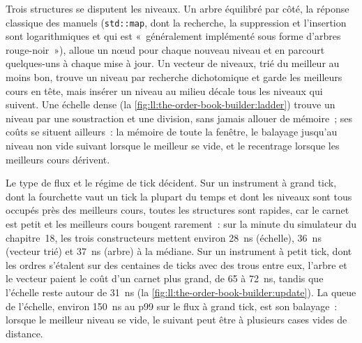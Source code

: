 Trois structures se disputent les niveaux. Un arbre équilibré par côté, la réponse classique des manuels (\texttt{std::map}, dont la recherche,
la suppression et l'insertion sont logarithmiques et qui est «~généralement implémenté sous forme d'arbres rouge-noir~»), alloue un nœud pour chaque nouveau
niveau et en parcourt quelques-uns à chaque mise à jour. Un vecteur de niveaux, trié du meilleur au moins bon, trouve un niveau par recherche dichotomique et garde
les meilleurs cours en tête, mais insérer un niveau au milieu décale tous les niveaux qui suivent. Une échelle dense
(la \cref{fig:ll:the-order-book-builder:ladder}) trouve un niveau par une soustraction et une division, sans jamais allouer de mémoire~; ses
coûts se situent ailleurs~: la mémoire de toute la fenêtre, le balayage jusqu'au niveau non vide suivant lorsque le meilleur se vide, et le
recentrage lorsque les meilleurs cours dérivent.

Le type de flux et le régime de tick décident. Sur un instrument à grand tick, dont la fourchette vaut un tick la plupart du temps et dont
les niveaux sont tous occupés près des meilleurs cours, toutes les structures sont rapides, car le carnet est petit et les meilleurs cours bougent rarement~: sur la
minute du simulateur du chapitre~18, les trois constructeurs mettent environ \qty{28}{\nano\second} (échelle), \qty{36}{\nano\second}
(vecteur trié) et \qty{37}{\nano\second} (arbre) à la médiane. Sur un instrument à petit tick, dont les ordres s'étalent sur des centaines
de ticks avec des trous entre eux, l'arbre et le vecteur paient le coût d'un carnet plus grand, de 65 à \qty{72}{\nano\second}, tandis que
l'échelle reste autour de \qty{31}{\nano\second} (la \cref{fig:ll:the-order-book-builder:update}). La queue de l'échelle, environ
\qty{150}{\nano\second} au p99 sur le flux à grand tick, est son balayage~: lorsque le meilleur niveau se vide, le suivant peut être
à plusieurs cases vides de distance.

